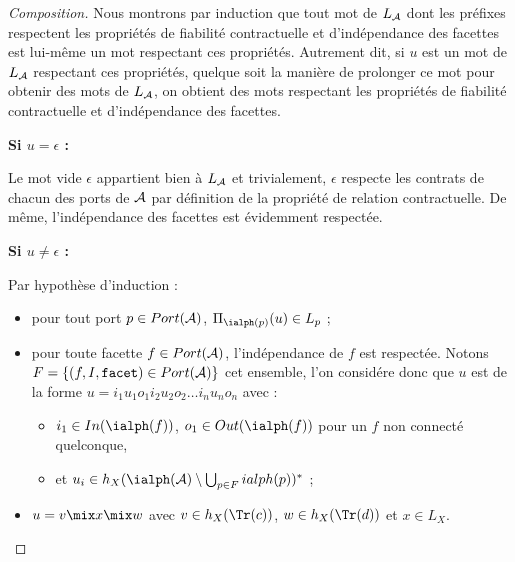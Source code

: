 \begin{proof}[Composition]
    Nous montrons par induction que tout mot de $L_{\cal A}$ dont les
    pr\'efixes respectent les propri\'et\'es de fiabilit\'e contractuelle et
    d'ind\'ependance des facettes est lui-m\^eme un mot respectant
    ces propri\'et\'es. Autrement dit, si $u$ est un mot de $L_{\cal
    A}$ respectant ces propri\'et\'es, quelque soit la  mani\`ere de
    prolonger ce mot pour obtenir des mots de $L_{\cal A}$, on obtient
    des mots respectant les propri\'et\'es de fiabilit\'e
    contractuelle et d'ind\'ependance des facettes.

\textbf{Si $u=\epsilon$ :}

    Le mot vide $\epsilon$ appartient bien \`a $L_{\cal A}$ et
    trivialement, 
    $\epsilon$ respecte les contrats de chacun des ports de $\cal A$
    par d\'efinition de la propri\'et\'e de relation contractuelle.
    De m\^eme, l'ind\'ependance des facettes est \'evidemment respect\'ee.

\textbf{Si $u\neq\epsilon$ :}

Par hypoth\`ese d'induction :
\begin{itemize}
  \item pour tout port $p\in Port(\cal A)$, $\Pi_{\ialph(p)}(u) \in L_p$ ;
  \item pour toute facette $f\in Port({\cal A})$, l'ind\'ependance de $f$ est respect\'ee. Notons
    $F=\{(f,I,\mathtt{facet}) \in Port({\cal A})\}$ cet ensemble, l'on
    consid\'ere donc que  $u$ est de la forme $u=i_1 u_1o_1 i_2
    u_2 o_2 \dots   i_n u_n o_n$ avec :
    \begin{itemize}
      \item $i_1\in In(\ialph(f))$, $o_1\in Out(\ialph(f))$ pour un
        $f$ non connect\'e quelconque,
      \item et $u_i\in h_X(\ialph({\cal
          A}) \setminus \bigcup_{p\in F}ialph(p))^*$ ;
    \end{itemize}
  \item $u = v \mix x \mix w$
    avec $v \in h_X(\Tr(c))$, $w\in h_X(\Tr(d))$ et $x\in L_X$.
\end{itemize}


\end{proof}
